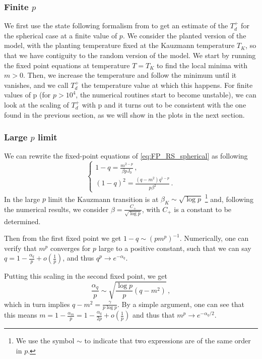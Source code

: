 \documentclass[superscriptaddress,amsmath, amssymb, onecolumn, pra]{revtex4-2}
\begin{document}
\subsubsection{Finite $p$}
We first use the state following formalism from \citep{krzakala_2010,sun_2012} to get an estimate of the $T_d^+$ for the spherical case at a finite value of $p$.
We consider the planted version of the model, with the planting temperature fixed at the Kauzmann temperature $T_K$, so that we have contiguity to the random version of the model.
We start by running the fixed point equations at temperature $T = T_K$ to find the local minima with $m > 0$.
Then, we increase the temperature and follow the minimum until it vanishes, and we call $T_d^+$ the temperature value at which this happens.
For finite values of p (for $p > 10^4$, the numerical routines start to become unstable), we can look at the scaling of $T_d^+$ with p and it turns out to be consistent with the one found in the previous section, as we will show in the plots in the next section.

\subsubsection{Large $p$ limit}
We can rewrite the fixed-point equations of \eqref{eq:FP_RS_spherical} as following
\begin{equation}
\begin{cases}
    1-q = \frac{m^{2-p}}{\beta p J_0}\,, \\
    (1-q)^2 = \frac{(q-m^2)q^{1-p}}{p\beta^2}\,.
\end{cases}
\end{equation}
In the large $p$ limit the Kauzmann transition is at $\beta_K \sim \sqrt{\log p}$ \footnote{We use the symbol $\sim$ to indicate that two expressions are of the same order in $p$.}\cite{kurchan1993barriers} and, following the numerical results, we consider $\beta = \frac{C_+}{\sqrt{\log p}}$, with $C_+$ is a constant to be determined.

Then from the first fixed point we get $1-q \sim (pm^p)^{-1}$. Numerically, one can verify that $m^p$ converges for $p$ large to a positive constant, such that we can say $q = 1 - \frac{\alpha_q}{p} + o(\frac{1}{p})$, and thus $q^p\to e^{-\alpha_q}$.

Putting this scaling in the second fixed point, we get
\begin{equation}
    \frac{\alpha_q}{p} \sim \sqrt{\frac{\log p}{p}(q-m^2)}\,,
\end{equation}
which in turn implies $q-m^2 = \frac{\gamma}{p\log p}$. By a simple argument, one can see that this means $m = 1 - \frac{\alpha_m}{p}= 1 - \frac{\alpha_q}{2p} + o(\frac{1}{p})$ and thus that $m^p\to e^{-\alpha_q/2}$.
\end{document}
